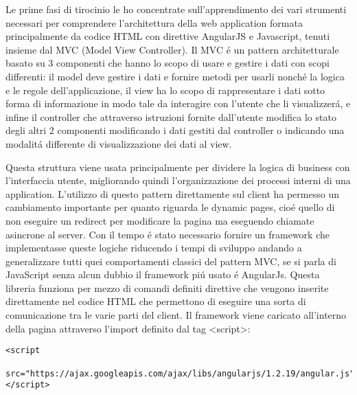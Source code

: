 \iffalse 
<studio di angularjs nel libro (vedi https://github.com/Wabri/UniversityInternship#day-01-020518--55-ore)>
\fi
Le prime fasi di tirocinio le ho concentrate sull'apprendimento dei vari strumenti necessari per comprendere l'architettura della web application formata principalmente da codice HTML con direttive AngularJS e Javascript, tenuti insieme dal MVC (Model View Controller).
Il MVC \'e un pattern architetturale basato su 3 componenti che hanno lo scopo di usare e gestire i dati con scopi differenti: il model deve gestire i dati e fornire metodi per usarli nonch\'e la logica e le regole dell'applicazione, il view ha lo scopo di rappresentare i dati sotto forma di informazione in modo tale da interagire con l'utente che li visualizzer\'a, e infine il controller che attraverso istruzioni fornite dall'utente modifica lo stato degli altri 2 componenti modificando i dati gestiti dal controller o indicando una modalit\'a differente di visualizzazione dei dati al view.
\iffalse
metti st'immagine o una simile
https://it.wikipedia.org/wiki/File:MVC-Process.png
\fi
Questa struttura viene usata principalmente per dividere la logica di business con l'interfaccia utente, migliorando quindi l'organizzazione dei processi interni di una application. 
L'utilizzo di questo pattern direttamente sul client ha permesso un cambiamento importante per quanto riguarda le dynamic pages, cio\'e quello di non eseguire un redirect per modificare la pagina ma eseguendo chiamate asincrone al server. 
Con il tempo \'e stato necessario fornire un framework che implementasse queste logiche riducendo i tempi di sviluppo andando a generalizzare tutti quei comportamenti classici del pattern MVC, se si parla di JavaScript senza alcun dubbio il framework pi\'u usato \'e AngularJs.
Questa libreria funziona per mezzo di comandi definiti direttive che vengono inserite direttamente nel codice HTML che permettono di eseguire una sorta di comunicazione tra le varie parti del client. Il framework viene caricato all'interno della pagina attraverso l'import definito dal tag <script>:
\begin{lstlisting}
<script 
 src="https://ajax.googleapis.com/ajax/libs/angularjs/1.2.19/angular.js">
</script>
\end{lstlisting}
